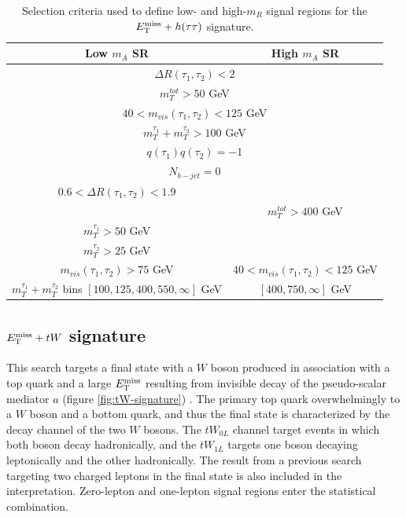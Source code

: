 \begin{table}[h!]
    \centering
    \begin{tabular}{|c|c|}
    \hline
     \textbf{Low $m_A$ SR}    &  \textbf{High $m_A$ SR} \\
     \hline
      \multicolumn{2}{|c|}{$\Delta R(\tau_1, \tau_2) < 2$}  \\ \hline
      \multicolumn{2}{|c|}{$m_T^{tot} > 50$ GeV }    \\ \hline
       \multicolumn{2}{|c|}{$40 < m_{vis}(\tau_1, \tau_2) < 125 $  GeV}  \\ \hline
        \multicolumn{2}{|c|}{$m_T^{\tau_1} + m_T^{\tau_2} > 100$ GeV} \\ \hline
        \multicolumn{2}{|c|}{$q(\tau_1)q(\tau_2)=-1$} \\  \hline
        \multicolumn{2}{|c|}{$N_{b-jet} = 0$} \\  \hline
        $0.6<\Delta R(\tau_1,\tau_2) < 1.9$  &   \\ \hline
        & $m_T^{tot}>400$ GeV \\ \hline
        $m_T^{\tau_1}>50$ GeV & \\ \hline
        $m_T^{\tau_2}>25$ GeV & \\ \hline
        $m_{vis}(\tau_1, \tau_2)>75$ GeV & $40<m_{vis}(\tau_1, \tau_2)<125$ GeV \\ 
    \hline
        $m_T^{\tau_1} + m_T^{\tau_2}$ bins $[100,125,400,550,\infty]$ GeV & $[400, 750, \infty]$ GeV \\ \hline
    \hline
    \end{tabular}
    \caption{Selection criteria used to define low- and high-$m_R$ signal regions for the $E_{\mathrm{T}}^{\mathrm{miss}}+h(\tau\tau)$ signature.}
    \label{tab:htautau-selection}
\end{table}

\subsection{\texorpdfstring{$E_{\mathrm{T}}^{\mathrm{miss}}+tW$}{TEXT} signature}
\label{subsect:metjw}
This search targets a final state with a $W$ boson produced in association with a top quark and a large $E_{\mathrm{T}}^{\mathrm{miss}}$ resulting from invisible decay of the pseudo-scalar mediator $a$ (figure \ref{fig:tW-signature}) \cite{EXOT-2021-01}. The primary top quark overwhelmingly to a $W$ boson and a bottom quark, and thus the final state is characterized by the decay channel of the two $W$ bosons. The $tW_{0L}$ channel target events in which both boson decay hadronically, and the $tW_{1L}$ targets one boson decaying leptonically and the other hadronically. The result from a previous search targeting two charged leptons \cite{EXOT-2018-43} in the final state is also included in the interpretation. Zero-lepton and one-lepton signal regions enter the statistical combination. 

